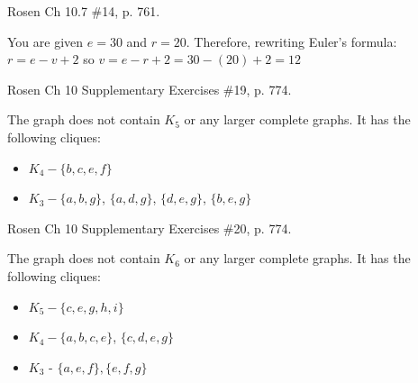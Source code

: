 \begin{questions}
\begin{solution}
\begin{enumerate}[label=(\alph*),itemsep=0pt,parsep=0pt,topsep=0pt,partopsep=0pt]

    \end{enumerate}

  \end{solution}



  \ifprintanswers
        \vspace{-10pt}
  \fi
{} Rosen Ch 10.7 \#14, p. 761.
  \ifprintanswers
        \vspace{-10pt}
  \fi
  \begin{solution}
    You are given $e = 30$ and $r = 20$. Therefore, rewriting Euler's formula: 
      $r = e - v + 2$ so $v = e - r + 2 = 30 - (20) + 2 = 12$
  \end{solution}



  \ifprintanswers
        \vspace{-10pt}
  \fi
{} Rosen Ch 10 Supplementary Exercises \#19, p. 774.
  \ifprintanswers
        \vspace{-10pt}
  \fi
  \begin{solution}
    The graph does not contain $K_5$ or any larger complete graphs.  It has the following cliques: 
    \begin{itemize}[itemsep=0pt,parsep=0pt,topsep=0pt,partopsep=0pt]
      \item $K_4 - \{b, c, e, f\}$ 
      \item $K_3 - \{a, b, g\}$, $\{a, d, g \}$, $\{d, e, g\}$, $\{b, e, g\}$
    \end{itemize}
  \end{solution}



  \ifprintanswers
        \vspace{-10pt}
  \fi
{} Rosen Ch 10 Supplementary Exercises \#20, p. 774.
  \ifprintanswers
        \vspace{-10pt}
  \fi
  \begin{solution}
  The graph does not contain $K_6$ or any larger complete graphs. It has the following cliques: 
  \begin{itemize}[itemsep=0pt,parsep=0pt,topsep=0pt,partopsep=0pt]
    \item $K_5 -  \{c, e, g, h, i\}$
    \item $K_4 -  \{a, b, c, e\}$, $\{c, d, e, g\}$
    \item $K_3$ - $\{a,e,f\}, \{e, f, g\}$
  \end{itemize}
  \end{solution}



\end{questions}
